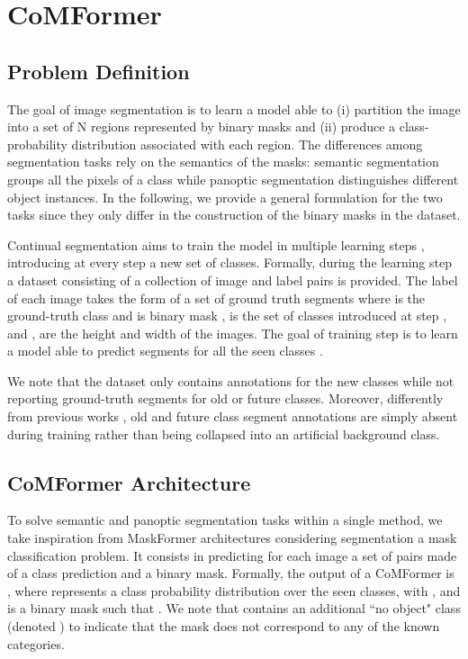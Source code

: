 \documentclass[10pt,twocolumn,letterpaper]{article}
\begin{document}
\section{CoMFormer}
\label{sec:method}
\subsection{Problem Definition} \label{sec:setting}
The goal of image segmentation is to learn a model able to (i) partition the image into a set of N regions represented by binary masks and (ii) produce a class-probability distribution associated with each region. The differences among segmentation tasks rely on the semantics of the masks: semantic segmentation groups all the pixels of a class while panoptic segmentation distinguishes different object instances. In the following, we provide a general formulation for the two tasks since they only differ in the construction of the binary masks in the dataset.

Continual segmentation aims to train the model in multiple learning steps , introducing at every step a new set of classes.
Formally, during the learning step  a dataset  consisting of a collection of image and label pairs is provided.
The label of each image takes the form of a set of  ground truth segments  where  is the ground-truth class and  is binary mask ,  is the set of classes introduced at step , and ,  are the height and width of the images. The goal of training step  is to learn a model able to predict segments for all the seen classes .

We note that the dataset only contains annotations for the new classes  while not reporting ground-truth segments for old  or future  classes. 
Moreover, differently from previous works \cite{cermelli2020modelingthebackground}, old and future class segment annotations are simply absent during training rather than being collapsed into an artificial background class. 

\subsection{CoMFormer Architecture}
To solve semantic and panoptic segmentation tasks within a single method, we take inspiration from MaskFormer architectures \cite{cheng2021maskformer, cheng2021masked} considering segmentation a mask classification problem. It consists in predicting for each image a set of  pairs made of a class prediction and a binary mask.
Formally, the output of a CoMFormer is , where  represents a class probability distribution over the seen classes, \ie  with , and  is a binary mask such that . We note that  contains an additional “no object" class (denoted ) to indicate that the mask does not correspond to any of the known  categories.
\end{document}
